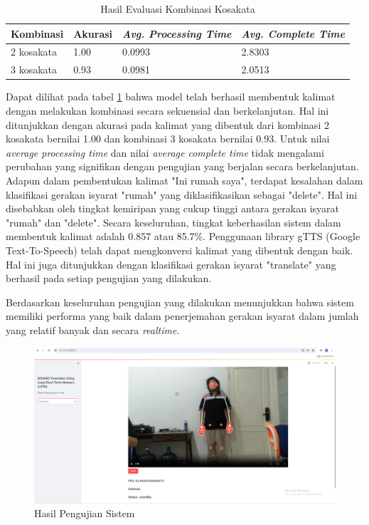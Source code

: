 \begin{table}[H]
  \caption{Hasil Evaluasi Kombinasi Kosakata}
  \label{tb:evaluasiKombinasi}
  \centering
  \begin{tabular}{llll}
    \hline
    \textbf{Kombinasi} & \textbf{Akurasi} & \emph{\textbf{Avg. Processing Time}} & \emph{\textbf{Avg. Complete Time}} \\
    \hline
    2 kosakata & 1.00 & 0.0993 & 2.8303 \\
    3 kosakata & 0.93 & 0.0981 & 2.0513 \\
    \hline
  \end{tabular}
\end{table}

Dapat dilihat pada tabel \ref{tb:evaluasiKombinasi} bahwa model telah berhasil membentuk kalimat dengan melakukan kombinasi secara sekuensial dan berkelanjutan. Hal ini ditunjukkan dengan akurasi pada kalimat yang dibentuk dari kombinasi 2 kosakata bernilai 1.00 dan kombinasi 3 kosakata bernilai 0.93. Untuk nilai \emph{average processing time} dan nilai \emph{average complete time} tidak mengalami perubahan yang signifikan dengan pengujian yang berjalan secara berkelanjutan. Adapun dalam pembentukan kalimat "Ini rumah saya", terdapat kesalahan dalam klasifikasi gerakan isyarat "rumah" yang diklasifikasikan sebagai "delete". Hal ini disebabkan oleh tingkat kemiripan yang cukup tinggi antara gerakan isyarat "rumah" dan "delete". Secara keseluruhan, tingkat keberhasilan sistem dalam membentuk kalimat adalah 0.857 atau 85.7\%. Penggunaan library gTTS (Google Text-To-Speech) telah dapat mengkonversi kalimat yang dibentuk dengan baik. Hal ini juga ditunjukkan dengan klasifikasi gerakan isyarat "translate" yang berhasil pada setiap pengujian yang dilakukan.

Berdasarkan keseluruhan pengujian yang dilakukan menunjukkan bahwa sistem memiliki performa yang baik dalam penerjemahan gerakan isyarat dalam jumlah yang relatif banyak dan secara \emph{realtime}.

\begin{figure}[ht]
    \centering

    \includegraphics[scale=0.12]{gambar/bab3-layoutweb.png}
 
    \caption{Hasil Pengujian Sistem}
    \label{fig:layoutweb}
\end{figure}